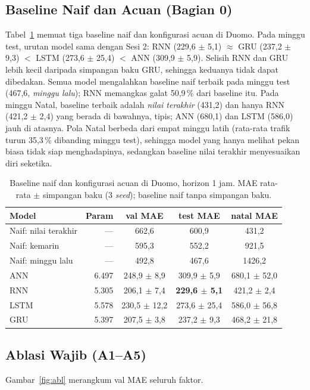 \documentclass[10pt,twocolumn,a4paper]{article}
\begin{document}
\subsection{Baseline Naif dan Acuan (Bagian 0)}
Tabel~\ref{tab:base} memuat tiga baseline naif dan konfigurasi acuan di Duomo. Pada minggu test, urutan model sama dengan Sesi 2: RNN (229,6 $\pm$ 5,1) $\approx$ GRU (237,2 $\pm$ 9,3) $<$ LSTM (273,6 $\pm$ 25,4) $<$ ANN (309,9 $\pm$ 5,9). Selisih RNN dan GRU lebih kecil daripada simpangan baku GRU, sehingga keduanya tidak dapat dibedakan. Semua model mengalahkan baseline naif terbaik pada minggu test (467,6, \emph{minggu lalu}); RNN memangkas galat 50,9\,\% dari baseline itu. Pada minggu Natal, baseline terbaik adalah \emph{nilai terakhir} (431,2) dan hanya RNN (421,2 $\pm$ 2,4) yang berada di bawahnya, tipis; ANN (680,1) dan LSTM (586,0) jauh di atasnya. Pola Natal berbeda dari empat minggu latih (rata-rata trafik turun 35,3\,\% dibanding minggu test), sehingga model yang hanya melihat pekan biasa tidak siap menghadapinya, sedangkan baseline nilai terakhir menyesuaikan diri seketika.

\begin{table}[t]
  \centering
  \caption{Baseline naif dan konfigurasi acuan di Duomo, horizon 1 jam. MAE rata-rata $\pm$ simpangan baku (3 \textit{seed}); baseline naif tanpa simpangan baku.}
  \label{tab:base}
  \footnotesize
  \setlength{\tabcolsep}{3pt}
  \begin{tabular}{@{}lrccc@{}}
    \toprule
    Model & Param & val MAE & test MAE & natal MAE \\
    \midrule
    Naif: nilai terakhir & --- & 662,6 & 600,9 & 431,2 \\
    Naif: kemarin & --- & 595,3 & 552,2 & 921,5 \\
    Naif: minggu lalu & --- & 492,8 & 467,6 & 1426,2 \\
    \midrule
    ANN & 6.497 & 248,9 $\pm$ 8,9 & 309,9 $\pm$ 5,9 & 680,1 $\pm$ 52,0 \\
    RNN & 5.305 & 206,1 $\pm$ 7,4 & \textbf{229,6 $\pm$ 5,1} & 421,2 $\pm$ 2,4 \\
    LSTM & 5.578 & 230,5 $\pm$ 12,2 & 273,6 $\pm$ 25,4 & 586,0 $\pm$ 56,8 \\
    GRU & 5.397 & 207,5 $\pm$ 3,8 & 237,2 $\pm$ 9,3 & 468,2 $\pm$ 21,8 \\
    \bottomrule
  \end{tabular}
\end{table}

\subsection{Ablasi Wajib (A1--A5)}
Gambar~\ref{fig:abl} merangkum val MAE seluruh faktor.
\end{document}
